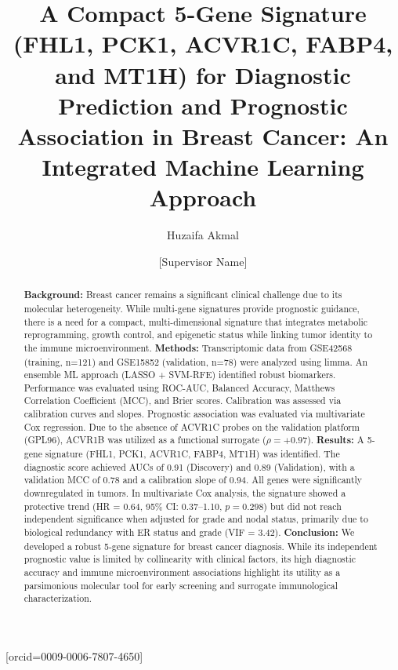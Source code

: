 \documentclass[a4paper,fleqn]{cas-sc}
\begin{document}
\let\WriteBookmarks\relax
\def\floatpagepagefraction{1}
\def\textpagefraction{.001}



\title [mode = title]{A Compact 5-Gene Signature (FHL1, PCK1, ACVR1C, FABP4, and MT1H) for Diagnostic Prediction and Prognostic Association in Breast Cancer: An Integrated Machine Learning Approach}  

\author[1]{Huzaifa Akmal}[orcid=0009-0006-7807-4650]

\author[1]{[Supervisor Name]}
\cormark[1]



\begin{abstract}
\textbf{Background:} Breast cancer remains a significant clinical challenge due to its molecular heterogeneity. While multi-gene signatures provide prognostic guidance, there is a need for a compact, multi-dimensional signature that integrates metabolic reprogramming, growth control, and epigenetic status while linking tumor identity to the immune microenvironment.
\textbf{Methods:} Transcriptomic data from GSE42568 (training, n=121) and GSE15852 (validation, n=78) were analyzed using limma. An ensemble ML approach (LASSO + SVM-RFE) identified robust biomarkers. Performance was evaluated using ROC-AUC, Balanced Accuracy, Matthews Correlation Coefficient (MCC), and Brier scores. Calibration was assessed via calibration curves and slopes. Prognostic association was evaluated via multivariate Cox regression. Due to the absence of ACVR1C probes on the validation platform (GPL96), ACVR1B was utilized as a functional surrogate ($\rho = +0.97$).
\textbf{Results:} A 5-gene signature (FHL1, PCK1, ACVR1C, FABP4, MT1H) was identified. The diagnostic score achieved AUCs of 0.91 (Discovery) and 0.89 (Validation), with a validation MCC of 0.78 and a calibration slope of 0.94. All genes were significantly downregulated in tumors. In multivariate Cox analysis, the signature showed a protective trend (HR = 0.64, 95\% CI: 0.37--1.10, $p = 0.298$) but did not reach independent significance when adjusted for grade and nodal status, primarily due to biological redundancy with ER status and grade (VIF = 3.42).
\textbf{Conclusion:} We developed a robust 5-gene signature for breast cancer diagnosis. While its independent prognostic value is limited by collinearity with clinical factors, its high diagnostic accuracy and immune microenvironment associations highlight its utility as a parsimonious molecular tool for early screening and surrogate immunological characterization.
\end{abstract}
\end{document}
